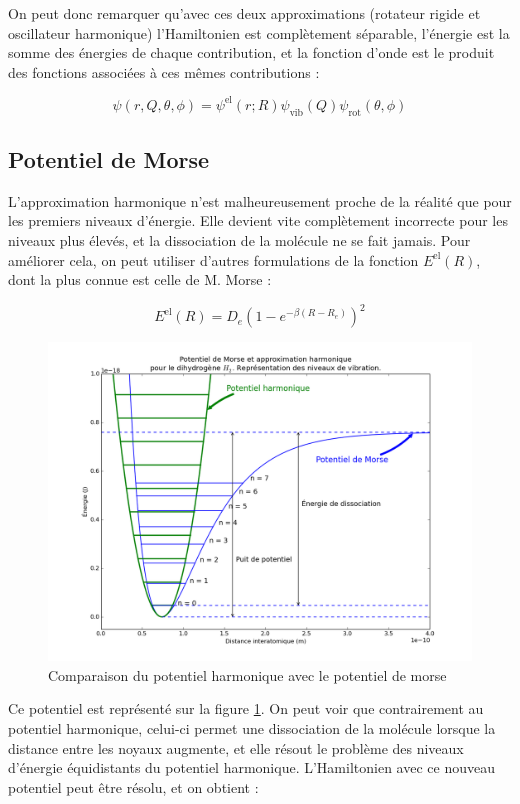 On peut donc remarquer qu'avec ces deux approximations (rotateur rigide et oscillateur harmonique) l'Hamiltonien est complètement séparable, l'énergie est la somme des énergies de chaque contribution, et la fonction d'onde est le produit des fonctions associées à ces mêmes contributions :


\[ \psi(r,Q,\theta,\phi) = \psi^\text{el}(r;R)\psi_\text{vib}(Q)\psi_\text{rot}(\theta,\phi) \]



\subsection{Potentiel de Morse}
L'approximation harmonique n'est malheureusement proche de la réalité que pour les premiers niveaux d'énergie. Elle devient vite complètement incorrecte pour les niveaux plus élevés, et la dissociation de la molécule ne se fait jamais. Pour améliorer cela, on peut utiliser d'autres formulations de la fonction $E^\text{el}(R)$, dont la plus connue est celle de M. Morse :


\[ E^\text{el}(R) = D_e(1-e^{-\beta(R-R_e)})^2 \]
\begin{figure}[htpb]
    \centering
    \includegraphics[scale=0.45]{Images3/potentiel_morse-04.png}
    \caption{Comparaison du potentiel harmonique avec le potentiel de morse}
    \label{fig:Morse}
\end{figure}
Ce potentiel est représenté sur la figure \ref{fig:Morse}.
On peut voir que contrairement au potentiel harmonique, celui-ci permet une dissociation de la molécule lorsque la distance entre les noyaux augmente, et elle résout le problème des niveaux d'énergie équidistants du potentiel harmonique. L'Hamiltonien avec ce nouveau potentiel peut être résolu, et on obtient :


